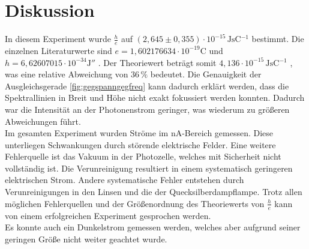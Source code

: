 \section{Diskussion}
\label{sec:Diskussion}

In diesem Experiment wurde $ \frac{h}{e}$ auf $(2,645 \pm 0,355) \cdot 10^{-15} \,\si{\joule\second\coulomb^{-1}}$ bestimmt.
Die einzelnen Literaturwerte sind $e = 1,602176634 \cdot 10^{-19} \unit{\coulomb} $ \cite{elchar} und $h= 6,62607015 \cdot 10^{-34} \unit{\joule \mathbin{\second}}$ \cite{go03}.
Der Theoriewert beträgt somit $4,136 \cdot 10^{-15} \,\si{\joule\second\coulomb^{-1}}$ , was eine relative Abweichung von $36 \, \%$ bedeutet. Die Genauigkeit der Ausgleichsgerade \autoref{fig:gegspanngegfreq} kann dadurch erklärt werden, dass die Spektrallinien in Breit und Höhe nicht exakt fokussiert werden konnten.
Dadurch war die Intensität an der Photonenstrom geringer, was wiederum zu größeren Abweichungen führt. \\

Im gesamten Experiment wurden Ströme im $\unit{\nano\ampere}$-Bereich gemessen. Diese unterliegen Schwankungen durch störende elektrische Felder.
Eine weitere Fehlerquelle ist das Vakuum in der Photozelle, welches mit Sicherheit nicht vollständig ist. Die Verunreinigung resultiert in einem systematisch geringeren elektrischen Strom.
Andere systematische Fehler entstehen durch Verunreinigungen in den Linsen und die der Quecksilberdampflampe. Trotz allen möglichen Fehlerquellen und der Größenordnung des Theoriewerts von $\frac{h}{e}$ kann von einem erfolgreichen Experiment gesprochen werden. \\
Es konnte auch ein Dunkelstrom gemessen werden, welches aber aufgrund seiner geringen Größe nicht weiter geachtet wurde.\\